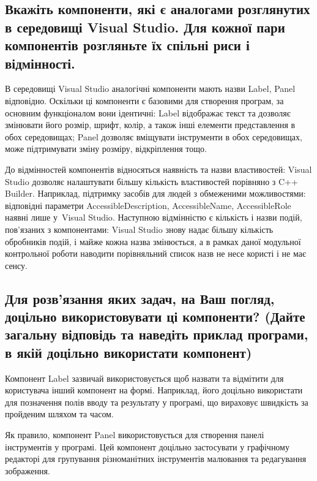 \documentclass[
	a4paper,
	oneside,
	BCOR = 10mm,
	DIV = 12,
	12pt,
	headings = normal,
]{scrartcl}
\begin{document}
		\subsection{Вкажіть компоненти, які є аналогами розглянутих в середовищі \textenglish{Visual Studio}. Для кожної пари компонентів розгляньте їх спільні риси і відмінності.}
			В середовищі \textenglish{Visual Studio} аналогічні компоненти мають назви \textenglish{Label, Panel} відповідно. Оскільки ці компоненти є базовими для створення програм, за основним функціоналом вони ідентичні: \textenglish{Label} відображає текст та дозволяє змінювати його розмір, шрифт, колір, а також інші елементи представлення в обох середовищах; \textenglish{Panel} дозволяє вміщувати інструменти в обох середовищах, може підтримувати зміну розміру, відкріплення тощо.
			
			До відмінностей компонентів відносяться наявність та назви властивостей: \textenglish{Visual Studio} дозволяє налаштувати більшу кількість властивостей порівняно з \textenglish{C++ Builder}. Наприклад, підтримку засобів для людей з обмеженими можливостями: відповідні параметри \textenglish{AccessibleDescription, AccessibleName, AccessibleRole} наявні лише у~\textenglish{Visual Studio}. Наступною відмінністю є кількість і назви подій, пов'язаних з компонентами: \textenglish{Visual Studio} знову надає більшу кількість обробників подій, і майже кожна назва змінюється, а в рамках даної модульної контрольної роботи наводити порівняльний список назв не несе користі і не має сенсу. 

		\subsection{Для розв'язання яких задач, на Ваш погляд, доцільно використовувати ці компоненти? (Дайте загальну відповідь та наведіть приклад програми, в якій доцільно використати компонент)}
			 Компонент \textenglish{Label} зазвичай використовується щоб назвати та відмітити для користувача інший компонент на формі. Наприклад, його доцільно використати для позначення полів вводу та результату у програмі, що вираховує швидкість за пройденим шляхом та часом.

				Як правило, компонент \textenglish{Panel} використовується для створення панелі інструментів у програмі. Цей компонент доцільно застосувати у графічному редакторі для групування різноманітних інструментів малювання та редагування зображення.
\end{document}
